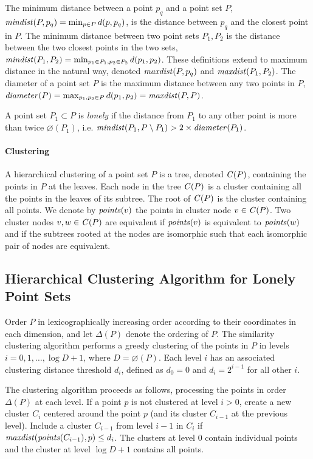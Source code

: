 The minimum distance between a point $p_q$ and a point set $P$, $\mathit{mindist}(P, p_q) = \min_{p \in P} d(p, p_q)$, is the distance between $p_q$ and the closest point in $P$. The minimum distance between two point sets $P_1, P_2$ is the distance between the two closest points in the two sets, $\mathit{mindist}(P_1, P_2) = \min_{p_1 \in P_1, p_2 \in P_2} d(p_1, p_2)$. These definitions extend to maximum distance in the natural way, denoted $\mathit{maxdist}(P, p_q)$ and $\mathit{maxdist}(P_1, P_2)$. The diameter of a point set $P$ is the maximum distance between any two points in $P$, $\mathit{diameter}(P) = \max_{p_1, p_2 \in P} d(p_1, p_2) = \mathit{maxdist}(P, P)$.

A point set $P_1 \subset P$ is \emph{lonely} if the distance from $P_1$ to any other point is more than twice $\diameter(P_1)$, i.e. $\mathit{mindist}(P_1, P \setminus P_1) > 2 \times \mathit{diameter}(P_1)$.

\paragraph{Clustering}
A hierarchical clustering of a point set $P$ is a tree, denoted $\mathit{C}(P)$, containing the points in $P$ at the leaves. Each node in the tree $\mathit{C}(P)$ is a cluster containing all the points in the leaves of its subtree. The root of $\mathit{C}(P)$ is the cluster containing all points. We denote by $\mathit{points}(v)$ the points in cluster node $v \in \mathit{C}(P)$. Two cluster nodes $v, w \in \mathit{C}(P)$ are equivalent if $\mathit{points}(v)$ is equivalent to $\mathit{points}(w)$ and if the subtrees rooted at the nodes are isomorphic such that each isomorphic pair of nodes are equivalent.

\subsection{Hierarchical Clustering Algorithm for Lonely Point Sets}
Order $P$ in lexicographically increasing order according to their coordinates in each dimension, and let $\Delta(P)$ denote the ordering of $P$.
The similarity clustering algorithm performs a greedy clustering of the points in $P$ in levels $i = 0, 1, \ldots, \log D+1$, where $D = \diameter(P)$. Each level $i$ has an associated clustering distance threshold $d_i$, defined as $d_0 = 0$ and $d_i = 2^{i-1}$ for all other $i$.

The clustering algorithm proceeds as follows, processing the points in order $\Delta(P)$ at each level. If a point $p$ is not clustered at level $i > 0$, create a new cluster $C_i$ centered around the point $p$ (and its cluster $C_{i-1}$ at the previous level). Include a cluster $C_{i-1}$ from level $i-1$ in $C_i$ if $\mathit{maxdist}(\mathit{points}(C_{i-1}), p) \leq d_i$. The clusters at level $0$ contain individual points and the cluster at level $\log D+1$ contains all points.

